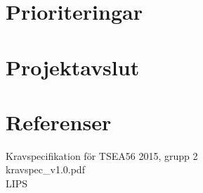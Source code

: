\documentclass[11pt]{article}
\begin{document}
\begin{flushleft}
\pagebreak

\section{Prioriteringar}

\pagebreak

\section{Projektavslut}

\setcounter{secnumdepth}{0}
\pagebreak
\section{Referenser}
Kravspecifikation för TSEA56 2015, grupp 2\\
kravspec\_v1.0.pdf \\[0.1in]

LIPS

\setcounter{secnumdepth}{2}


\end{flushleft}
\end{document}
